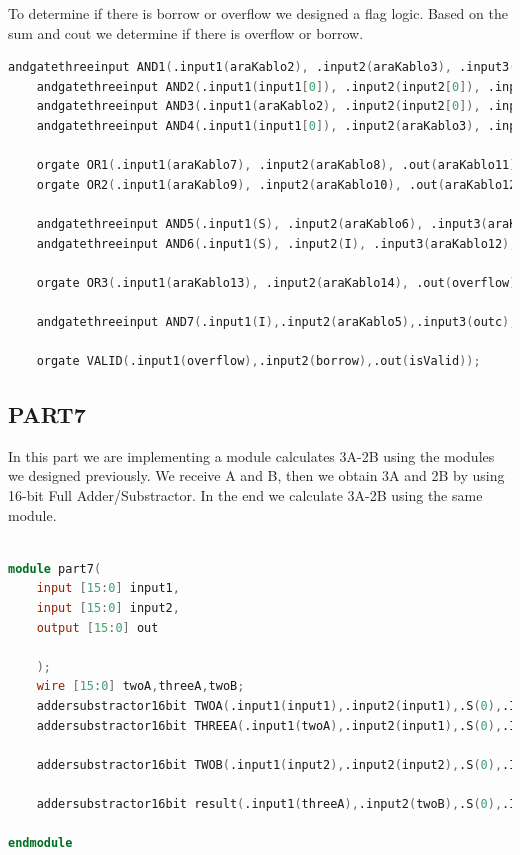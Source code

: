 \documentclass[pdftex,12pt,a4paper]{article}
\begin{document}
To determine if there is borrow or overflow we designed a flag logic. Based on the sum and cout we determine if there is overflow or borrow.

\begin{lstlisting}[language = Verilog]
    andgatethreeinput AND1(.input1(araKablo2), .input2(araKablo3), .input3(sum[0]), .out(araKablo7)); // A_0' and B_0' and SUM_0
    andgatethreeinput AND2(.input1(input1[0]), .input2(input2[0]), .input3(araKablo4), .out(araKablo8)); //A_0 and B_0 and SUM_0'
    andgatethreeinput AND3(.input1(araKablo2), .input2(input2[0]), .input3(sum[0]), .out(araKablo9)); //A_0' and B_0 and SUM_0
    andgatethreeinput AND4(.input1(input1[0]), .input2(araKablo3), .input3(araKablo4), .out(araKablo10)); //A_0 and B_0' and SUM_0'
    
    orgate OR1(.input1(araKablo7), .input2(araKablo8), .out(araKablo11)); 
    orgate OR2(.input1(araKablo9), .input2(araKablo10), .out(araKablo12));

    andgatethreeinput AND5(.input1(S), .input2(araKablo6), .input3(araKablo11), .out(araKablo13));
    andgatethreeinput AND6(.input1(S), .input2(I), .input3(araKablo12), .out(araKablo14));
    
    orgate OR3(.input1(araKablo13), .input2(araKablo14), .out(overflow));

    andgatethreeinput AND7(.input1(I),.input2(araKablo5),.input3(outc),.out(borrow));
    
    orgate VALID(.input1(overflow),.input2(borrow),.out(isValid));
\end{lstlisting}

\subsection{PART7}
In this part we are implementing a module calculates 3A-2B using the modules we designed previously. We receive A and B, then we obtain 3A and 2B by using 16-bit Full Adder/Substractor. In the end we calculate 3A-2B using the same module.

\begin{lstlisting}[language = Verilog]

module part7(
    input [15:0] input1,
    input [15:0] input2,
    output [15:0] out
   
    );
    wire [15:0] twoA,threeA,twoB;
    addersubstractor16bit TWOA(.input1(input1),.input2(input1),.S(0),.I(0),.sum(twoA));//2a
    addersubstractor16bit THREEA(.input1(twoA),.input2(input1),.S(0),.I(0),.sum(threeA));//3a
    
    addersubstractor16bit TWOB(.input1(input2),.input2(input2),.S(0),.I(0),.sum(twoB));//2b
    
    addersubstractor16bit result(.input1(threeA),.input2(twoB),.S(0),.I(1),.sum(out));//2a

endmodule

\end{lstlisting}
\end{document}

